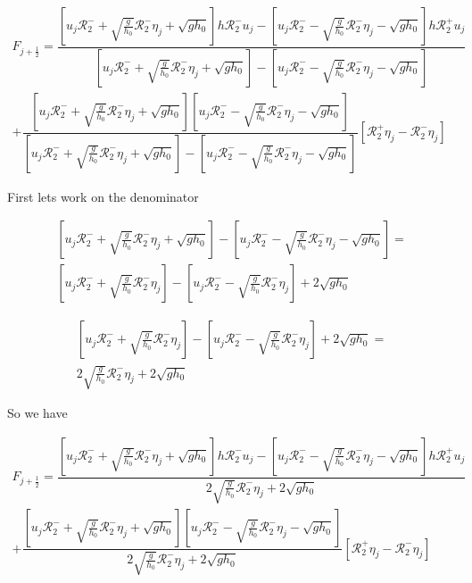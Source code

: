 \documentclass[12pt]{article}
\begin{document}
\begin{multline}
F_{j+\frac{1}{2}} = \dfrac{\left[u_{j}\mathcal{R}_2^- + \sqrt{\frac{g}{h_0}} \mathcal{R}_2^- \eta_{j} + \sqrt{gh_0}\right]  h\mathcal{R}_2^- u_j - \left[u_{j}\mathcal{R}_2^- - \sqrt{\frac{g}{h_0}} \mathcal{R}_2^- \eta_{j} - \sqrt{gh_0}\right] h\mathcal{R}_2^+ u_j}{\left[u_{j}\mathcal{R}_2^- + \sqrt{\frac{g}{h_0}} \mathcal{R}_2^- \eta_{j} + \sqrt{gh_0}\right] - \left[u_{j}\mathcal{R}_2^- - \sqrt{\frac{g}{h_0}} \mathcal{R}_2^- \eta_{j} - \sqrt{gh_0}\right]}  \\
+ \dfrac{\left[u_{j}\mathcal{R}_2^- + \sqrt{\frac{g}{h_0}} \mathcal{R}_2^- \eta_{j} + \sqrt{gh_0}\right] \left[u_{j}\mathcal{R}_2^- - \sqrt{\frac{g}{h_0}} \mathcal{R}_2^- \eta_{j} - \sqrt{gh_0}\right]}{{\left[u_{j}\mathcal{R}_2^- + \sqrt{\frac{g}{h_0}} \mathcal{R}_2^- \eta_{j} + \sqrt{gh_0}\right] - \left[u_{j}\mathcal{R}_2^- - \sqrt{\frac{g}{h_0}} \mathcal{R}_2^- \eta_{j} - \sqrt{gh_0}\right]} } \left [ \mathcal{R}_2^+\eta_j - \mathcal{R}_2^-\eta_j\right ]
\end{multline}


First lets work on the denominator

\begin{multline}
\left[u_{j}\mathcal{R}_2^- + \sqrt{\frac{g}{h_0}} \mathcal{R}_2^- \eta_{j} + \sqrt{gh_0}\right] - \left[u_{j}\mathcal{R}_2^- - \sqrt{\frac{g}{h_0}} \mathcal{R}_2^- \eta_{j} - \sqrt{gh_0}\right] = \\
\left[u_{j}\mathcal{R}_2^- + \sqrt{\frac{g}{h_0}} \mathcal{R}_2^- \eta_{j} \right] - \left[u_{j}\mathcal{R}_2^- - \sqrt{\frac{g}{h_0}} \mathcal{R}_2^- \eta_{j}\right] + 2\sqrt{gh_0}
\end{multline}

\begin{multline}
\left[u_{j}\mathcal{R}_2^- + \sqrt{\frac{g}{h_0}} \mathcal{R}_2^- \eta_{j} \right] - \left[u_{j}\mathcal{R}_2^- - \sqrt{\frac{g}{h_0}} \mathcal{R}_2^- \eta_{j}\right] + 2\sqrt{gh_0} = \\
2\sqrt{\frac{g}{h_0}} \mathcal{R}_2^-\eta_{j}  + 2\sqrt{gh_0}
\end{multline}

So we have

\begin{multline}
F_{j+\frac{1}{2}} = \dfrac{\left[u_{j}\mathcal{R}_2^- + \sqrt{\frac{g}{h_0}} \mathcal{R}_2^- \eta_{j} + \sqrt{gh_0}\right]  h\mathcal{R}_2^- u_j - \left[u_{j}\mathcal{R}_2^- - \sqrt{\frac{g}{h_0}} \mathcal{R}_2^- \eta_{j} - \sqrt{gh_0}\right] h\mathcal{R}_2^+ u_j}{2\sqrt{\frac{g}{h_0}} \mathcal{R}_2^-\eta_{j}  + 2\sqrt{gh_0}}  \\
+ \dfrac{\left[u_{j}\mathcal{R}_2^- + \sqrt{\frac{g}{h_0}} \mathcal{R}_2^- \eta_{j} + \sqrt{gh_0}\right] \left[u_{j}\mathcal{R}_2^- - \sqrt{\frac{g}{h_0}} \mathcal{R}_2^- \eta_{j} - \sqrt{gh_0}\right]}{2\sqrt{\frac{g}{h_0}} \mathcal{R}_2^-\eta_{j}  + 2\sqrt{gh_0} } \left [ \mathcal{R}_2^+\eta_j - \mathcal{R}_2^-\eta_j\right ]
\end{multline}
\end{document}
